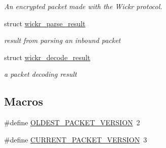 \begin{DoxyCompactItemize}
\begin{DoxyCompactList}\small\item\em An encrypted packet made with the Wickr protocol. \end{DoxyCompactList}\item 
struct \hyperlink{structwickr__parse__result}{wickr\+\_\+parse\+\_\+result}
\begin{DoxyCompactList}\small\item\em result from parsing an inbound packet \end{DoxyCompactList}\item 
struct \hyperlink{structwickr__decode__result}{wickr\+\_\+decode\+\_\+result}
\begin{DoxyCompactList}\small\item\em a packet decoding result \end{DoxyCompactList}\end{DoxyCompactItemize}
\subsection*{Macros}
\begin{DoxyCompactItemize}
\item 
\#define \hyperlink{group__wickr__protocol_gad269883d0b8b26c4fa52da595ef5ddf7}{O\+L\+D\+E\+S\+T\+\_\+\+P\+A\+C\+K\+E\+T\+\_\+\+V\+E\+R\+S\+I\+ON}~2
\item 
\#define \hyperlink{group__wickr__protocol_ga89ff9f93c5494db53d3ff27353989862}{C\+U\+R\+R\+E\+N\+T\+\_\+\+P\+A\+C\+K\+E\+T\+\_\+\+V\+E\+R\+S\+I\+ON}~3
\end{DoxyCompactItemize}
